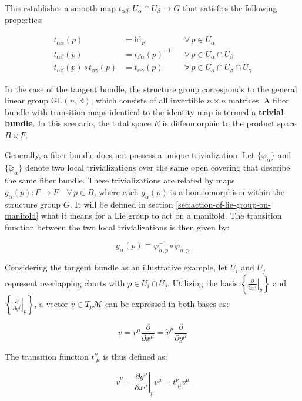 This establishes a smooth map \(t_{\alpha\beta}: U_\alpha \cap U_\beta \to G\) that satisfies the following properties:

\begin{align*}
  t_{\alpha \alpha}(p) &= \mathrm{id}_F && \forall\, p \in U_\alpha \\
  t_{\alpha\beta}(p) &= t_{\beta\alpha}(p)^{-1} && \forall\, p \in U_\alpha \cap U_\beta \\
  t_{\alpha\beta}(p) \circ t_{\beta\gamma}(p) &= t_{\alpha\gamma}(p) && \forall\, p \in U_\alpha \cap U_\beta \cap U_\gamma
\end{align*}

In the case of the tangent bundle, the structure group corresponds to the general linear group \(\mathrm{GL}(n, \mathbb{R})\), which consists of all invertible \(n \times n\) matrices. 
A fiber bundle with transition maps identical to the identity map is termed a \textbf{trivial bundle}. In this scenario, the total space \(E\) is diffeomorphic to the product space \(B \times F\). 

Generally, a fiber bundle does not possess a unique trivialization. Let \(\{\varphi_\alpha\}\) and \(\{\tilde{\varphi}_\alpha\}\) denote two local trivializations over the same open covering that describe the same fiber bundle. These trivializations are related by maps \(g_\alpha(p) : F \to F \quad \forall\, p \in B\), where each \(g_\alpha(p)\) is a homeomorphism within the structure group \(G\). It will be defined in section \ref{sec:action-of-lie-group-on-manifold} what it means for a Lie group to act on a manifold. The transition function between the two local trivializations is then given by:

\[
g_\alpha(p) \equiv \varphi_{\alpha,p}^{-1} \circ \tilde{\varphi}_{\alpha,p}
\]

Considering the tangent bundle as an illustrative example\cite{NakaharaGeometrytopologyphysics2005}, let \(U_i\) and \(U_j\) represent overlapping charts with \(p \in U_i \cap U_j\). Utilizing the basis \(\left\{ \left. \frac{\partial}{\partial x^i} \right|_p \right\}\) and \(\left\{ \left. \frac{\partial}{\partial y^j} \right|_p \right\}\), a vector \(v \in T_p\mathcal{M}\) can be expressed in both bases as:

\[
v = v^{\mu} \frac{\partial}{\partial x^{\mu}} = \tilde{v}^{\mu} \frac{\partial}{\partial y^{\mu}}
\]

The transition function \(t^\nu_{\,\,\mu}\) is thus defined as:

\[
\tilde{v}^\nu = \left.\frac{\partial y^\nu}{\partial x^\mu}\right|_p v^\mu = t^\nu_{\,\,\mu} v^\mu
\]

